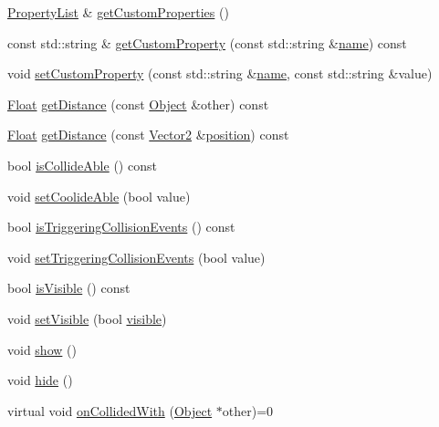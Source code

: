 \begin{DoxyCompactItemize}
\item 
\hyperlink{classZeta_1_1PropertyList}{Property\+List} \& \hyperlink{classZeta_1_1Object_a5f6f0eb7c70118ec76f4ba2d09cff1c8}{get\+Custom\+Properties} ()
\item 
const std\+::string \& \hyperlink{classZeta_1_1Object_a1dc8e69a73ed1d19d848c10ab7da6bdc}{get\+Custom\+Property} (const std\+::string \&\hyperlink{classZeta_1_1Object_ace4ef81b7c300e0a170292e9888cd66f}{name}) const 
\item 
void \hyperlink{classZeta_1_1Object_a807e2507c0238b8f81c48b08f9b45055}{set\+Custom\+Property} (const std\+::string \&\hyperlink{classZeta_1_1Object_ace4ef81b7c300e0a170292e9888cd66f}{name}, const std\+::string \&value)
\item 
\hyperlink{namespaceZeta_a1e0a1265f9b3bd3075fb0fabd39088ba}{Float} \hyperlink{classZeta_1_1Object_a270ae3be74f7e45effe46acd35f8a05a}{get\+Distance} (const \hyperlink{classZeta_1_1Object}{Object} \&other) const 
\item 
\hyperlink{namespaceZeta_a1e0a1265f9b3bd3075fb0fabd39088ba}{Float} \hyperlink{classZeta_1_1Object_a414f8fbbc7cec966b793d85de9ec8fad}{get\+Distance} (const \hyperlink{classZeta_1_1Vector2}{Vector2} \&\hyperlink{classZeta_1_1Object_a4035f758ac73cb1f0e4d85778d033956}{position}) const 
\item 
bool \hyperlink{classZeta_1_1Object_ab5fdb9b738428321a464baaf9bbc90d4}{is\+Collide\+Able} () const 
\item 
void \hyperlink{classZeta_1_1Object_ac5e5f960bb9b1d0a88ff888650e5bd24}{set\+Coolide\+Able} (bool value)
\item 
bool \hyperlink{classZeta_1_1Object_a0bedbadc3c7caf3fa6ce80f9c3b9f7e0}{is\+Triggering\+Collision\+Events} () const 
\item 
void \hyperlink{classZeta_1_1Object_a2fad9e395b31a55f23ad0f17f47935e2}{set\+Triggering\+Collision\+Events} (bool value)
\item 
bool \hyperlink{classZeta_1_1Object_a8a1bc7d5c04a5345466146e14d75a6e3}{is\+Visible} () const 
\item 
void \hyperlink{classZeta_1_1Object_a5b7631e0546ac0a8b6fba5a4bc35c28c}{set\+Visible} (bool \hyperlink{classZeta_1_1Object_ade6a7a114b24232510cb6a23a2547f4d}{visible})
\item 
void \hyperlink{classZeta_1_1Object_ac17a97edf8f43464ac51c852ebecaf44}{show} ()
\item 
void \hyperlink{classZeta_1_1Object_af7f50768ceed6021d81b45ecfaac4d8f}{hide} ()
\item 
virtual void \hyperlink{classZeta_1_1Object_ae8d403a3bb343fb169347251b8eaa219}{on\+Collided\+With} (\hyperlink{classZeta_1_1Object}{Object} $\ast$other)=0

\end{DoxyCompactItemize}
